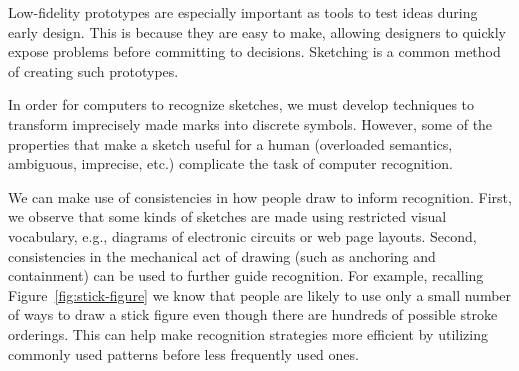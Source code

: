 Low-fidelity prototypes are especially important as tools to test
ideas during early design. This is because they are easy to make,
allowing designers to quickly expose problems before committing to
decisions. Sketching is a common method of creating such prototypes.

In order for computers to recognize sketches, we must develop
techniques to transform imprecisely made marks into discrete
symbols. However, some of the properties that make a sketch useful for
a human (overloaded semantics, ambiguous, imprecise, etc.) complicate
the task of computer recognition.

We can make use of consistencies in how people draw to inform
recognition. First, we observe that some kinds of sketches are made
using restricted visual vocabulary, e.g., diagrams of electronic
circuits or web page layouts. Second, consistencies in the mechanical
act of drawing (such as anchoring and containment) can be used to
further guide recognition. For example, recalling
Figure~\ref{fig:stick-figure} we know that people are likely to use
only a small number of ways to draw a stick figure even though there
are hundreds of possible stroke orderings. This can help make
recognition strategies more efficient by utilizing commonly used
patterns before less frequently used ones.
